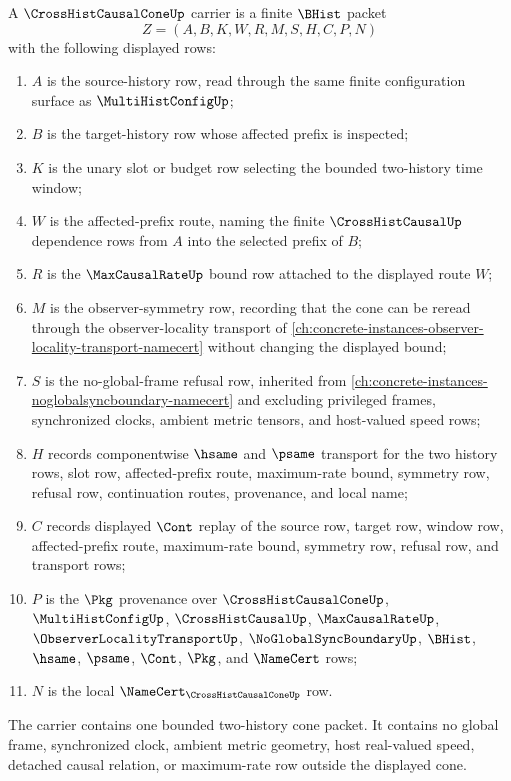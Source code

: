 \begin{definition}
\label{def:cross-hist-causal-cone-carrier}
A $\CrossHistCausalConeUp$ carrier is a finite $\BHist$ packet
$$
Z=(A,B,K,W,R,M,S,H,C,P,N)
$$
with the following displayed rows:
\begin{enumerate}
\item $A$ is the source-history row, read through the same finite configuration surface as $\MultiHistConfigUp$;
\item $B$ is the target-history row whose affected prefix is inspected;
\item $K$ is the unary slot or budget row selecting the bounded two-history time window;
\item $W$ is the affected-prefix route, naming the finite $\CrossHistCausalUp$ dependence rows from $A$ into the selected prefix of $B$;
\item $R$ is the $\MaxCausalRateUp$ bound row attached to the displayed route $W$;
\item $M$ is the observer-symmetry row, recording that the cone can be reread through the observer-locality transport of \autoref{ch:concrete-instances-observer-locality-transport-namecert} without changing the displayed bound;
\item $S$ is the no-global-frame refusal row, inherited from \autoref{ch:concrete-instances-noglobalsyncboundary-namecert} and excluding privileged frames, synchronized clocks, ambient metric tensors, and host-valued speed rows;
\item $H$ records componentwise $\hsame$ and $\psame$ transport for the two history rows, slot row, affected-prefix route, maximum-rate bound, symmetry row, refusal row, continuation routes, provenance, and local name;
\item $C$ records displayed $\Cont$ replay of the source row, target row, window row, affected-prefix route, maximum-rate bound, symmetry row, refusal row, and transport rows;
\item $P$ is the $\Pkg$ provenance over $\CrossHistCausalConeUp$, $\MultiHistConfigUp$, $\CrossHistCausalUp$, $\MaxCausalRateUp$, $\ObserverLocalityTransportUp$, $\NoGlobalSyncBoundaryUp$, $\BHist$, $\hsame$, $\psame$, $\Cont$, $\Pkg$, and $\NameCert$ rows;
\item $N$ is the local $\NameCert_{\CrossHistCausalConeUp}$ row.
\end{enumerate}
The carrier contains one bounded two-history cone packet. It contains no global frame, synchronized clock, ambient metric geometry, host real-valued speed, detached causal relation, or maximum-rate row outside the displayed cone.
\end{definition}


